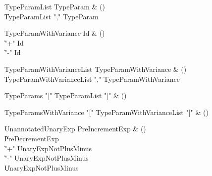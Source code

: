 \begin{bbgrammar}

TypeParamList \label{prod:TypeParamList}  \: TypeParam & () \\

    \| TypeParamList \xcd"," TypeParam \\

\end{bbgrammar}

\begin{bbgrammar}

TypeParamWithVariance \label{prod:TypeParamWithVariance}  \: Id & () \\

    \| \xcd"+" Id \\
    \| \xcd"-" Id \\

\end{bbgrammar}

\begin{bbgrammar}

TypeParamWithVarianceList \label{prod:TypeParamWithVarianceList}  \: TypeParamWithVariance & () \\

    \| TypeParamWithVarianceList \xcd"," TypeParamWithVariance \\

\end{bbgrammar}

\begin{bbgrammar}

TypeParams \label{prod:TypeParams}  \: \xcd"[" TypeParamList \xcd"]" & () \\


\end{bbgrammar}

\begin{bbgrammar}

TypeParamsWithVariance \label{prod:TypeParamsWithVariance}  \: \xcd"[" TypeParamWithVarianceList \xcd"]" & () \\


\end{bbgrammar}

\begin{bbgrammar}

UnannotatedUnaryExp \label{prod:UnannotatedUnaryExp}  \: PreIncrementExp & () \\

    \| PreDecrementExp \\
    \| \xcd"+" UnaryExpNotPlusMinus \\
    \| \xcd"-" UnaryExpNotPlusMinus \\
    \| UnaryExpNotPlusMinus \\

\end{bbgrammar}

